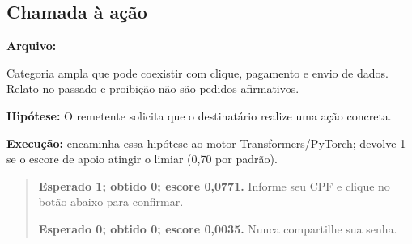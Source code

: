 \subsection{Chamada à ação}

\textbf{Arquivo:} \par

Categoria ampla que pode coexistir com clique, pagamento e envio de dados. Relato no passado e proibição não são pedidos afirmativos.

\textbf{Hipótese:} O remetente solicita que o destinatário realize uma ação concreta.

\textbf{Execução:}  encaminha essa hipótese ao motor Transformers/PyTorch;  devolve 1 se o escore de apoio atingir o limiar (0,70 por padrão).

\begin{quote}\small

\textbf{Esperado 1; obtido 0; escore 0,0771.} Informe seu CPF e clique no botão abaixo para confirmar.\par

\textbf{Esperado 0; obtido 0; escore 0,0035.} Nunca compartilhe sua senha.\par

\end{quote}
